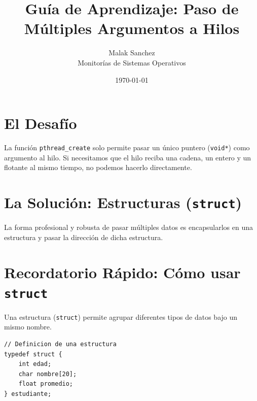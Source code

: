 \documentclass[12pt,a4paper]{article}
\title{\textbf{Guía de Aprendizaje: Paso de Múltiples Argumentos a Hilos}}
\author{Malak Sanchez \\ \small Monitorías de Sistemas Operativos}
\date{\today}
\begin{document}
\maketitle

\section{El Desafío}
La función \texttt{pthread\_create} solo permite pasar un único puntero (\texttt{void*}) como argumento al hilo. Si necesitamos que el hilo reciba una cadena, un entero y un flotante al mismo tiempo, no podemos hacerlo directamente.

\section{La Solución: Estructuras (\texttt{struct})}
La forma profesional y robusta de pasar múltiples datos es encapsularlos en una estructura y pasar la dirección de dicha estructura.

\begin{center}
\end{center}

\section{Recordatorio Rápido: Cómo usar \texttt{struct}}
Una estructura (\texttt{struct}) permite agrupar diferentes tipos de datos bajo un mismo nombre.

\begin{lstlisting}
// Definicion de una estructura
typedef struct {
    int edad;
    char nombre[20];
    float promedio;
} estudiante;
\end{lstlisting}
\end{document}

